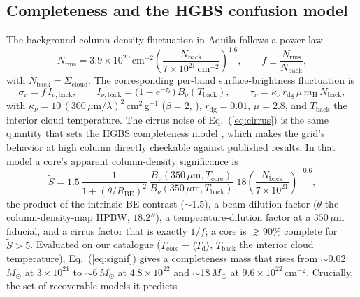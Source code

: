 \documentclass[11pt,a4paper]{article}
\newcommand{\msun}{M_{\odot}}
\newcommand{\Rbe}{R_{\mathrm{BE}}}
\newcommand{\Scloud}{\Sigma_{\mathrm{cloud}}}
\newcommand{\mH}{m_{\mathrm{H}}}
\begin{document}
\subsection{Completeness and the HGBS confusion model}
\label{sec:completeness}

The background column-density fluctuation in Aquila follows a power law
\citep{Konyves+2015}
\begin{equation}
  N_{\mathrm{rms}} = 3.9\times10^{20}\,\mathrm{cm^{-2}}
  \left(\frac{N_{\mathrm{back}}}{7\times10^{21}\,\mathrm{cm^{-2}}}\right)^{1.6},
  \qquad f \equiv \frac{N_{\mathrm{rms}}}{N_{\mathrm{back}}},
  \label{eq:cirrus}
\end{equation}
with $N_{\mathrm{back}}=\Scloud$. The corresponding per-band surface-brightness
fluctuation is
\begin{equation}
  \sigma_\nu = f\,I_{\nu,\mathrm{back}}, \qquad
  I_{\nu,\mathrm{back}} = \bigl(1-e^{-\tau_\nu}\bigr)\,B_\nu(T_{\mathrm{back}}),
  \qquad
  \tau_\nu = \kappa_\nu\,r_{\mathrm{dg}}\,\mu\,\mH\,N_{\mathrm{back}},
  \label{eq:Iback}
\end{equation}
with $\kappa_\nu=10\,(300\,\mu\mathrm{m}/\lambda)^{2}$\,cm$^{2}$\,g$^{-1}$
($\beta=2$, \citealt{Konyves+2015}), $r_{\mathrm{dg}}=0.01$, $\mu=2.8$, and
$T_{\mathrm{back}}$ the interior cloud temperature. The cirrus noise of
Eq.~(\ref{eq:cirrus}) is the same quantity that sets the
HGBS completeness model \citep[][Appendix~B.2]{Konyves+2015}, which makes the
grid's behavior at high column directly checkable against published results.
In that model a core's apparent column-density significance is
\begin{equation}
  \tilde S = 1.5\,
  \frac{1}{1+(\theta/\Rbe)^{2}}\,
  \frac{B_{\nu}(350\,\mu\mathrm{m},T_{\mathrm{core}})}{B_{\nu}(350\,\mu\mathrm{m},T_{\mathrm{back}})}\;
  18\left(\frac{N_{\mathrm{back}}}{7\times10^{21}}\right)^{-0.6},
  \label{eq:signif}
\end{equation}
the product of the intrinsic BE contrast ($\sim$1.5), a beam-dilution factor
($\theta$ the column-density-map HPBW, $18.2''$), a temperature-dilution
factor at a $350\,\mu$m fiducial, and a cirrus factor that is exactly $1/f$;
a core is $\gtrsim$90\% complete for $\tilde S>5$. Evaluated on our catalogue
($T_{\mathrm{core}}=\langle T_{\mathrm d}\rangle$, $T_{\mathrm{back}}$ the
interior cloud temperature), Eq.~(\ref{eq:signif}) gives a completeness mass
that rises from $\sim$0.02\,$\msun$ at $3\times10^{21}$ to $\sim$6\,$\msun$ at
$4.8\times10^{22}$ and $\sim$18\,$\msun$ at $9.6\times10^{22}\,
\mathrm{cm^{-2}}$. Crucially, the set of recoverable models it predicts
\end{document}
